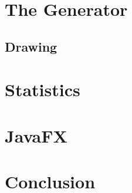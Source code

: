 \documentclass[a4paper,10pt]{paper}
\begin{document}
\section{The Generator}

\subsection{Drawing}

\section{Statistics}

\section{JavaFX}

\section{Conclusion}
\end{document}
